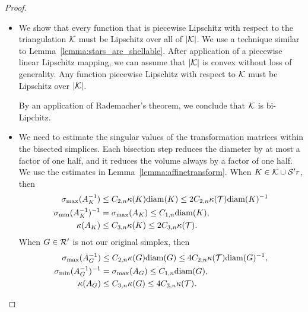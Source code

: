 \documentclass[10pt,letterpaper]{article}
\begin{document}
\begin{proof}
\begin{itemize}
        \item 
        \color{red}
        We show that every function that is piecewise Lipschitz with respect to the triangulation ${\mathcal K}$ must be Lipschitz over all of $|{\mathcal K}|$. 
        We use a technique similar to Lemma~\ref{lemma:stars_are_shellable}. 
        After application of a piecewise linear Lipschitz mapping, 
        we can assume that $|{\mathcal K}|$ is convex without loss of generality. 
        Any function piecewise Lipschitz with respect to ${\mathcal K}$ must be Lipschitz over $|{\mathcal K}|$. 
        
        By an application of Rademacher's theorem, we conclude that ${\mathcal K}$ is bi-Lipchitz. 
        \color{black}
        
        
        \item 
        We need to estimate the singular values of the transformation matrices within the bisected simplices. 
        Each bisection step reduces the diameter by at most a factor of one half,
        and it reduces the volume always by a factor of one half. 
        We use the estimates in Lemma~\ref{lemma:affinetransform}.
        When $K \in {\mathcal K} \cup {\mathcal S}'r$, then 
        \begin{align*}
             \sigma_{\max}( A_{K}^{-1} )
             &\leq 
             C_{2,n} \kappa(K) {\operatorname{diam}}(K)
             \leq 
             2 C_{2,n} \kappa({\mathcal T}) {\operatorname{diam}}(K)^{-1}
             \\
             \sigma_{\min}( A_{K}^{-1} )^{-1}
             &= 
             \sigma_{\max}( A_{K} ) 
             \leq 
             C_{1,n} {\operatorname{diam}}(K),
             \\ 
             \kappa( A_{K} )
             &\leq 
             C_{3,n} \kappa(K) \leq 2 C_{3,n} \kappa({\mathcal T})
             .
        \end{align*}
        When ${G} \in {\mathcal R}'$ is not our original simplex, then 
        \begin{align*}
             \sigma_{\max}( A_{{G}}^{-1} )
             &\leq 
             \Czwei{n} \kappa({G}) \diam({G})
             \leq 
             4 \Czwei{n} \kappa(\calT) \diam(G)^{-1},
             \\
             \sigma_{\min}( A_{{G}}^{-1} )^{-1}
             &= 
             \sigma_{\max}( A_{{G}} ) 
             \leq 
             \Ceins{n} \diam({G}),
             \\ 
             \kappa( A_{{G}} )
             &\leq 
             \Csechs{n} \kappa({G}) \leq 4 \Csechs{n} \kappa(\calT)
             .

\end{align*}
\end{itemize}
\end{proof}
\end{document}
